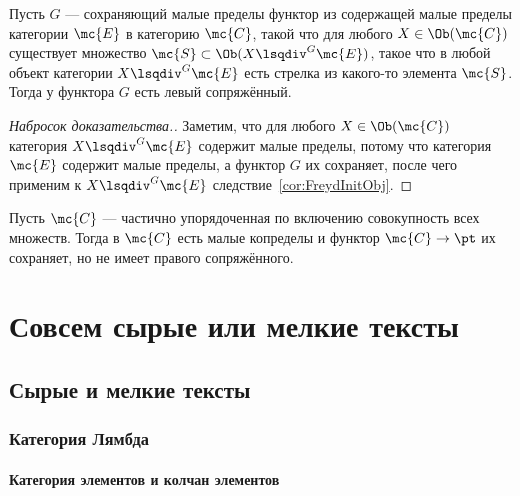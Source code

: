 \documentclass[
	extrafontsizes,
	11pt,
	hyphens,
]{memoir}
\begin{document}
\begin{theorem}
Пусть \(G\) --- сохраняющий малые пределы функтор из содержащей малые пределы категории \(\mc{E}\) в категорию \(\mc{C}\),
такой что для любого \(X \in \Ob(\mc{C})\) существует множество \(\mc{S} \subset \Ob(X \lsqdiv^G \mc{E})\), такое что в любой объект категории \(X \lsqdiv^G \mc{E}\) есть стрелка из какого-то элемента \(\mc{S}\).
Тогда у функтора \(G\) есть левый сопряжённый.
\end{theorem}

\begin{proof}[Набросок доказательства.]
Заметим, что для любого \(X \in \Ob(\mc{C})\) категория \(X \lsqdiv^G \mc{E}\) содержит малые пределы, потому что категория \(\mc{E}\) содержит малые пределы, а функтор \(G\) их сохраняет, после чего применим к \(X \lsqdiv^G \mc{E}\) следствие~\ref{cor:FreydInitObj}.
\end{proof}

\begin{example}
Пусть \(\mc{C}\) --- частично упорядоченная по включению совокупность всех множеств.
Тогда в \(\mc{C}\) есть малые копределы и функтор \(\mc{C} \to \pt\) их сохраняет, но не имеет правого сопряжённого.
\end{example}




\part{Совсем сырые или мелкие тексты}



%



\chapter{Сырые и мелкие тексты}


\section{Категория Лямбда}

\subsection{Категория элементов и колчан элементов}
\end{document}

